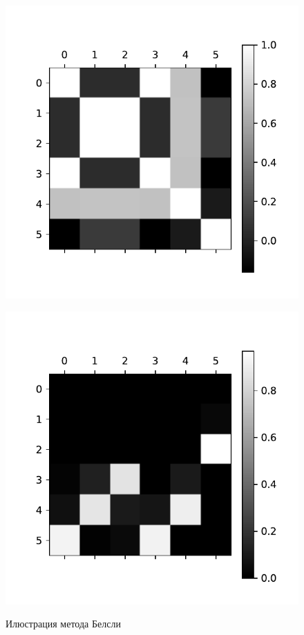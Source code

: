 \begin{figure}[h!t]\center
\begin{minipage}[t]{.45\textwidth}
{\includegraphics[width=\textwidth]{plots/grabovoy/Cov.pdf}}
\end{minipage}
\begin{minipage}[t]{.45\textwidth}
{\includegraphics[width=\textwidth]{plots/grabovoy/BelslyImage.pdf}}
\end{minipage}
\caption{Илюстрация метода Белсли}
\label{CovBel}
\end{figure}

